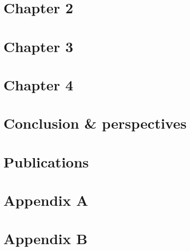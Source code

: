 \documentclass[a4paper, 12pt, twoside,openright]{report}
\begin{document}
	\chapter{Chapter 2}
	\minitoc
		
		
		
		
		
		

	\chapter{Chapter 3}
	\minitoc
		
		
		
		
		
		

	\chapter{Chapter 4}
	\minitoc
		
		
		
		
		
		
	\chapter{Conclusion \& perspectives}
		
		
	\chapter{Publications}
		

\appendix
	\chapter{Appendix A}
	\minitoc
		
		
		
		
		

	\chapter{Appendix B}
%		
		\footnotesize
		
%	

\printbibliography
	
\end{document}
